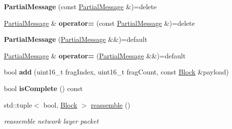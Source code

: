 \begin{DoxyCompactItemize}
\item 
{\bfseries Partial\+Message} (const \hyperlink{classnfd_1_1ndnlp_1_1PartialMessage}{Partial\+Message} \&)=delete\hypertarget{classnfd_1_1ndnlp_1_1PartialMessage_ae6b26d97c3627ec61283ce9eaa0abc81}{}\label{classnfd_1_1ndnlp_1_1PartialMessage_ae6b26d97c3627ec61283ce9eaa0abc81}

\item 
\hyperlink{classnfd_1_1ndnlp_1_1PartialMessage}{Partial\+Message} \& {\bfseries operator=} (const \hyperlink{classnfd_1_1ndnlp_1_1PartialMessage}{Partial\+Message} \&)=delete\hypertarget{classnfd_1_1ndnlp_1_1PartialMessage_aeee173a6bfdb087f589f22fd9eceb752}{}\label{classnfd_1_1ndnlp_1_1PartialMessage_aeee173a6bfdb087f589f22fd9eceb752}

\item 
{\bfseries Partial\+Message} (\hyperlink{classnfd_1_1ndnlp_1_1PartialMessage}{Partial\+Message} \&\&)=default\hypertarget{classnfd_1_1ndnlp_1_1PartialMessage_a4d528ea94554c4c17f0348bc29ec8e8e}{}\label{classnfd_1_1ndnlp_1_1PartialMessage_a4d528ea94554c4c17f0348bc29ec8e8e}

\item 
\hyperlink{classnfd_1_1ndnlp_1_1PartialMessage}{Partial\+Message} \& {\bfseries operator=} (\hyperlink{classnfd_1_1ndnlp_1_1PartialMessage}{Partial\+Message} \&\&)=default\hypertarget{classnfd_1_1ndnlp_1_1PartialMessage_a81924a7815c7a37572b17ab1c333e861}{}\label{classnfd_1_1ndnlp_1_1PartialMessage_a81924a7815c7a37572b17ab1c333e861}

\item 
bool {\bfseries add} (uint16\+\_\+t frag\+Index, uint16\+\_\+t frag\+Count, const \hyperlink{classndn_1_1Block}{Block} \&payload)\hypertarget{classnfd_1_1ndnlp_1_1PartialMessage_a163e0f54b2207be63427c4649b5c38bb}{}\label{classnfd_1_1ndnlp_1_1PartialMessage_a163e0f54b2207be63427c4649b5c38bb}

\item 
bool {\bfseries is\+Complete} () const\hypertarget{classnfd_1_1ndnlp_1_1PartialMessage_ade860ab6d668d293d2e74e0f19c97890}{}\label{classnfd_1_1ndnlp_1_1PartialMessage_ade860ab6d668d293d2e74e0f19c97890}

\item 
std\+::tuple$<$ bool, \hyperlink{classndn_1_1Block}{Block} $>$ \hyperlink{classnfd_1_1ndnlp_1_1PartialMessage_aa2b967ff8e0d3135a458fa93be6f2d8f}{reassemble} ()
\begin{DoxyCompactList}\small\item\em reassemble network layer packet \end{DoxyCompactList}\end{DoxyCompactItemize}
